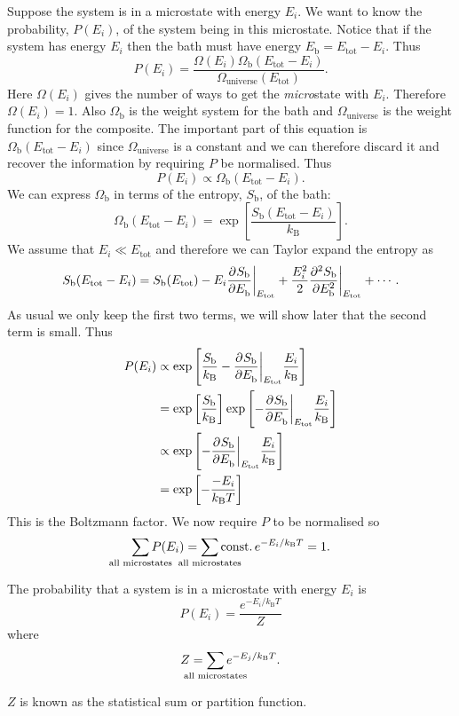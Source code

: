 \documentclass[a4paper]{article}
\newcommand{\boltzmann}{k_\mathrm{B}}
\newcommand{\tot}{{\mathrm{tot}}}
\newcounter{keypointcounter}
\newenvironment{keypoint}{%
    \stepcounter{keypointcounter}
    \begin{tcolorbox}[breakable, title=Key Point \thekeypointcounter]
}{%
    \end{tcolorbox}
}
\begin{document}
    Suppose the system is in a microstate with energy \(E_i\).
    We want to know the probability, \(P(E_i)\), of the system being in this microstate.
    Notice that if the system has energy \(E_i\) then the bath must have energy \(E_{\mathrm{b}} = E_{\tot} - E_i\).
    Thus
    \[P(E_i) = \frac{\Omega(E_i)\Omega_{\mathrm{b}}(E_{\tot} - E_i)}{\Omega_{\mathrm{universe}}(E_{\tot})}.\]
    Here \(\Omega(E_i)\) gives the number of ways to get the \emph{micro}state with \(E_i\).
    Therefore \(\Omega(E_i) = 1\).
    Also \(\Omega_{\mathrm{b}}\) is the weight system for the bath and \(\Omega_{\mathrm{universe}}\) is the weight function for the composite.
    The important part of this equation is \(\Omega_{\mathrm{b}}(E_{\tot} - E_i)\) since \(\Omega_{\mathrm{universe}}\) is a constant and we can therefore discard it and recover the information by requiring \(P\) be normalised.
    Thus
    \[P(E_i) \propto \Omega_{\mathrm{b}}(E_{\tot} - E_i).\]
    We can express \(\Omega_{\mathrm{b}}\) in terms of the entropy, \(S_{\mathrm{b}}\), of the bath:
    \[\Omega_{\mathrm{b}}(E_{\tot} - E_i) = \exp\left[\frac{S_{\mathrm{b}}(E_{\tot} - E_i)}{\boltzmann}\right].\]
    We assume that \(E_i \ll E_{\tot}\) and therefore we can Taylor expand the entropy as
    \[S_{\mathrm{b}}(E_{\tot} - E_i) = S_{\mathrm{b}}(E_{\tot}) - E_i\pdvat{S_{\mathrm{b}}}{E_{\mathrm{b}}}{E_{\tot}} + \frac{E_i^2}{2}\pdvat[2]{S_{\mathrm{b}}}{E_{\mathrm{b}}}{E_{\tot}} + \dotsb.\]
    As usual we only keep the first two terms, we will show later that the second term is small.
    Thus
    \begin{align*}
        P(E_i) &\propto \exp\left[\frac{S_{\mathrm{b}}}{\boltzmann} - \pdvat{S_{\mathrm{b}}}{E_{\mathrm{b}}}{E_{\tot}} \frac{E_i}{\boltzmann}\right]\\
        &= \exp\left[\frac{S_{\mathrm{b}}}{\boltzmann}\right] \exp\left[-\pdvat{S_{\mathrm{b}}}{E_{\mathrm{b}}}{E_{\tot}} \frac{E_i}{\boltzmann}\right]\\
        &\propto \exp\left[-\pdvat{S_{\mathrm{b}}}{E_{\mathrm{b}}}{E_{\tot}} \frac{E_i}{\boltzmann}\right]\\
        &= \exp\left[-\frac{-E_i}{\boltzmann T}\right]
    \end{align*}
    This is the Boltzmann factor.
    We now require \(P\) to be normalised so
    \[\sum_{\mathclap{\text{all microstates}}} P(E_i) = \sum_{\mathclap{\text{all microstates}}} \mathrm{const.}\,e^{-E_i/\boltzmann T} = 1.\]
    \begin{keypoint}
        The probability that a system is in a microstate with energy \(E_i\) is
        \[P(E_i) = \frac{e^{-E_i/\boltzmann T}}{Z}\]
        where
        \[Z = \sum_{\mathclap{\text{all microstates}}} e^{-E_j/\boltzmann T}.\]
    \end{keypoint}
    \(Z\) is known as the statistical sum or partition function.
    
\end{document}
